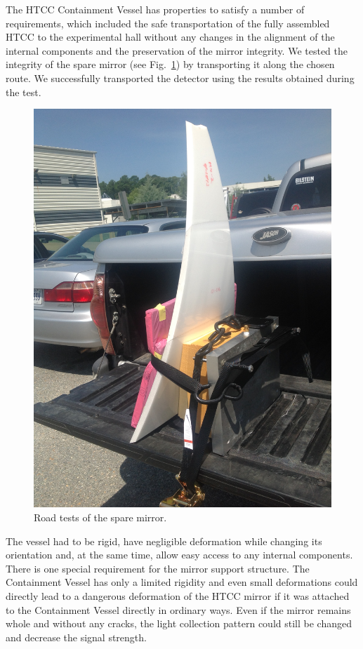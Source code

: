 The HTCC Containment Vessel has properties to satisfy a number of requirements, which included the safe
transportation of the fully assembled HTCC to the experimental hall without any changes in the alignment of the
internal components and the preservation of the mirror integrity. We tested the integrity of the spare mirror
(see Fig.~\ref{fig:transportation_spare_mirror}) by transporting it along the chosen route. We successfully
transported the detector using the results obtained during the test. 

\begin{figure}[ht]
    \centering
    \includegraphics[trim={1.5cm 5cm 0 2cm }, clip, width=\linewidth]{images/Road_Test.JPG}
    \caption{Road tests of the spare mirror.}
    \label{fig:transportation_spare_mirror}
\end{figure}

The vessel had to be rigid, have negligible deformation while changing its orientation and, at the same time, allow
easy access to any internal components. There is one special requirement for the mirror support structure. The
Containment Vessel has only a limited rigidity and even small deformations could directly lead to a dangerous
deformation of the HTCC mirror if it was attached to the Containment Vessel directly in ordinary ways. Even if
the mirror remains whole and without any cracks, the light collection pattern could still be changed and decrease
the signal strength.

